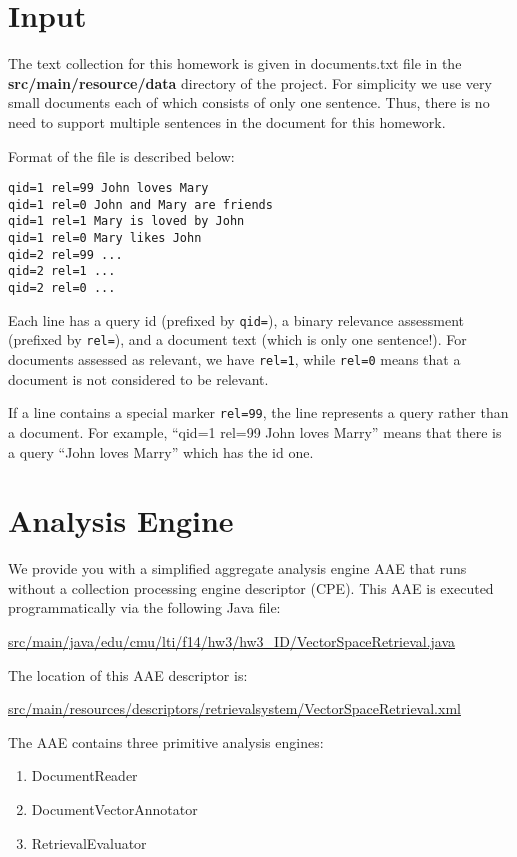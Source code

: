 \documentclass[oneside,11pt]{memoir}
\begin{document}
\section{Input}
The text collection for this homework is given in documents.txt file in 
the \textbf{src/main/resource/data} directory of the project. 
For simplicity we use very small documents each of which
consists of only one sentence.
Thus, there is no need to support multiple sentences in the document for this
homework.

Format of the file is described below:

\begin{verbatim}
qid=1 rel=99 John loves Mary 
qid=1 rel=0 John and Mary are friends
qid=1 rel=1 Mary is loved by John
qid=1 rel=0 Mary likes John
qid=2 rel=99 ...
qid=2 rel=1 ...
qid=2 rel=0 ...
\end{verbatim}

Each line has a query id (prefixed by \texttt{qid=}), 
a binary relevance assessment (prefixed by \texttt{rel=}), 
and a document text (which is only one sentence!). 
For documents assessed as relevant, we have \texttt{rel=1},
while \texttt{rel=0} means that a document is not considered to be relevant.

If a line contains a special marker \texttt{rel=99},
the line represents a query rather than a document.
For example, ``qid=1 rel=99 John loves Marry'' means
that there is a query ``John loves Marry'' which has the id one.

\section{Analysis Engine}
\label{SectionAe}
We provide you with a simplified aggregate analysis engine AAE that runs without 
a collection processing engine descriptor (CPE).
This AAE is executed programmatically via the following Java file:

\begin{center}\url{src/main/java/edu/cmu/lti/f14/hw3/hw3_ID/VectorSpaceRetrieval.java} \end{center}

The location of this AAE descriptor is:

\begin{center}\url{src/main/resources/descriptors/retrievalsystem/VectorSpaceRetrieval.xml} \end{center}

The AAE contains three primitive analysis engines:
\begin{enumerate}
\item DocumentReader
\item DocumentVectorAnnotator
\item RetrievalEvaluator
\end{enumerate}
\end{document}
